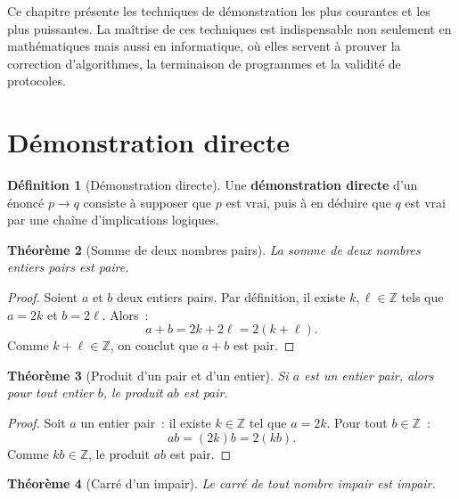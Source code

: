 \documentclass[12pt,a4paper,openany]{book}
\theoremstyle{definition}
\newtheorem{definition}{Définition}[chapter]
\theoremstyle{plain}
\newtheorem{theoreme}[definition]{Théorème}
\theoremstyle{remark}
\newcommand{\Z}{\mathbb{Z}}
\begin{document}
Ce chapitre pr\'esente les techniques de d\'emonstration les plus courantes et les plus puissantes. La ma\^itrise de ces techniques est indispensable non seulement en math\'ematiques mais aussi en informatique, o\`u elles servent \`a prouver la correction d'algorithmes, la terminaison de programmes et la validit\'e de protocoles.

\section{D\'emonstration directe}
\label{sec:preuve-directe}

\begin{definition}[D\'emonstration directe]\label{def:preuve-directe}
  Une \textbf{d\'emonstration directe} d'un \'enonc\'e $p \to q$ consiste \`a supposer que $p$ est vrai, puis \`a en d\'eduire que $q$ est vrai par une cha\^ine d'implications logiques.
\end{definition}

\begin{theoreme}[Somme de deux nombres pairs]\label{thm:somme-pairs}
  La somme de deux nombres entiers pairs est paire.
\end{theoreme}

\begin{proof}
  Soient $a$ et $b$ deux entiers pairs. Par d\'efinition, il existe $k, \ell \in \Z$ tels que $a = 2k$ et $b = 2\ell$. Alors~:
  \[
    a + b = 2k + 2\ell = 2(k + \ell).
  \]
  Comme $k + \ell \in \Z$, on conclut que $a + b$ est pair.
\end{proof}

\begin{theoreme}[Produit d'un pair et d'un entier]\label{thm:produit-pair}
  Si $a$ est un entier pair, alors pour tout entier $b$, le produit $ab$ est pair.
\end{theoreme}

\begin{proof}
  Soit $a$ un entier pair~: il existe $k \in \Z$ tel que $a = 2k$. Pour tout $b \in \Z$~:
  \[
    ab = (2k)b = 2(kb).
  \]
  Comme $kb \in \Z$, le produit $ab$ est pair.
\end{proof}

\begin{theoreme}[Carr\'e d'un impair]\label{thm:carre-impair}
  Le carr\'e de tout nombre impair est impair.
\end{theoreme}
\end{document}
